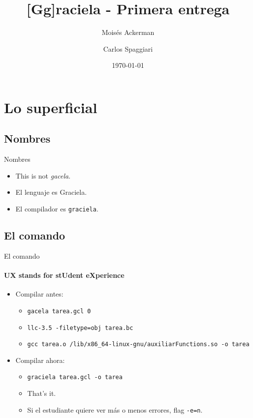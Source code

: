 \documentclass{beamer}
\title[Graciela]{[Gg]raciela - Primera entrega}
\author[Ackerman - Spaggiari]{Moisés Ackerman \and Carlos Spaggiari}
\institute[USB]{Universidad Simón Bolívar}
\date{\today{}}
\begin{document}
\begin{frame}
  \titlepage
\end{frame}


\section{Lo superficial}

\subsection{Nombres}
\begin{frame}{Nombres}
\begin{itemize}
  \item This is not \textit{gacela}.
  \item El lenguaje es Graciela.
  \item El compilador es \texttt{graciela}.
\end{itemize}
\end{frame}


\subsection{El comando}
\begin{frame}{El comando}
\framesubtitle{UX stands for stUdent eXperience}
\begin{itemize}
  \item Compilar antes: \begin{itemize}
    \item\texttt{gacela tarea.gcl 0}
    \item\texttt{llc-3.5 -filetype=obj tarea.bc}
    \item\texttt{gcc tarea.o /lib/x86\_64-linux-gnu/auxiliarFunctions.so -o tarea}
  \end{itemize}
   \item Compilar ahora: \begin{itemize}
    \item\texttt{graciela tarea.gcl -o tarea}
    \item That's it.
    \item Si el estudiante quiere ver más o menos errores, flag \texttt{-e=n}.
  \end{itemize}
\end{itemize}
\end{frame}
\end{document}
